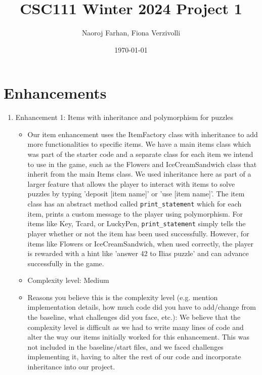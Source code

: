 \documentclass[11pt]{article}
\title{CSC111 Winter 2024 Project 1}
\author{Naoroj Farhan, Fiona Verzivolli}
\date{\today}
\begin{document}
\maketitle

\section*{Enhancements}


\begin{enumerate}

\item Enhancement 1: Items with inheritance and polymorphism for puzzles
    \begin{itemize}
    \item Our item enhancement uses the ItemFactory class with inheritance to add more functionalities to specific items. We have a main items class which was part of the starter code and a separate class for each item we intend to use in the game, such as the Flowers and IceCreamSandwich class that inherit from the main Items class. We used inheritance here as part of a larger feature that allows the player to interact with items to solve puzzles by typing 'deposit [item name]' or 'use [item name]'. The item class has an abstract method called \texttt{print\_statement} which for each item, prints a custom message to the player using polymorphism. For items like Key, Tcard, or LuckyPen, \texttt{print\_statement} simply tells the player whether or not the item has been used successfully. However, for items like Flowers or IceCreamSandwich, when used correctly, the player is rewarded with a hint like 'answer 42 to Ilias puzzle' and can advance successfully in the game.
 
    \item Complexity level: Medium
 
    \item Reasons you believe this is the complexity level (e.g. mention implementation details, how much code did you have to add/change from the baseline, what challenges did you face, etc.):
    We believe that the complexity level is difficult as we had to write many lines of code and alter the way our items initially worked for this enhancement. This was not included in the baseline/start files, and we faced challenges implementing it, having to alter the rest of our code and incorporate inheritance into our project.
    \end{itemize}
 


\end{enumerate}
\end{document}
